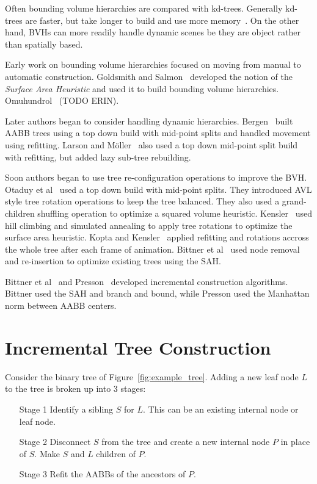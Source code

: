 \documentclass{article}
\begin{document}
Often bounding volume hierarchies are compared with kd-trees. Generally kd-trees are faster, but take longer to build and use more memory~\cite{Vinkler2014}. On the other hand, BVHs can more readily handle dynamic scenes be they are object rather than spatially based.

Early work on bounding volume hierarchies focused on moving from manual to automatic construction. Goldsmith and Salmon~\cite{Goldsmith1987} developed the notion of the \emph{Surface Area Heuristic} and used it to build bounding volume hierarchies. Omuhundrol~\cite{Omohundrol1989} (TODO ERIN).

Later authors began to consider handling dynamic hierarchies. Bergen~\cite{Bergen1998} built AABB trees using a top down build with mid-point splits and handled movement using refitting. Larson and Möller~\cite{Larsson2006} also used a top down mid-point split build with refitting, but added lazy sub-tree rebuilding.

Soon authors began to use tree re-configuration operations to improve the BVH. Otaduy et al~\cite{Otaduy2007} used a top down build with mid-point splits. They introduced AVL style tree rotation operations to keep the tree balanced. They also used a grand-children shuffling operation to optimize a squared volume heuristic. Kensler~\cite{Kensler2008} used hill climbing and simulated annealing to apply tree rotations to optimize the surface area heuristic. Kopta and Kensler~\cite{Kopta2012} applied refitting and rotations accross the whole tree after each frame of animation. Bittner et al~\cite{Bittner2013} used node removal and re-insertion to optimize existing trees using the SAH.

Bittner et al~\cite{Bittner2015} and Presson~\cite{Presson2008} developed incremental construction algorithms. Bittner used the SAH and branch and bound, while Presson used the Manhattan norm between AABB centers.

\section{Incremental Tree Construction}

Consider the binary tree of Figure~\ref{fig:example_tree}. Adding a new leaf node $L$ to the tree is broken up into 3 stages:
\begin{enumerate}
	\item[Stage 1] Identify a sibling $S$ for $L$. This can be an existing internal node or leaf node.
	\item[Stage 2] Disconnect $S$ from the tree and create a new internal node $P$ in place of $S$. Make $S$ and $L$ children of $P$.
	\item[Stage 3] Refit the AABBs of the ancestors of $P$.
\end{enumerate}
\end{document}
